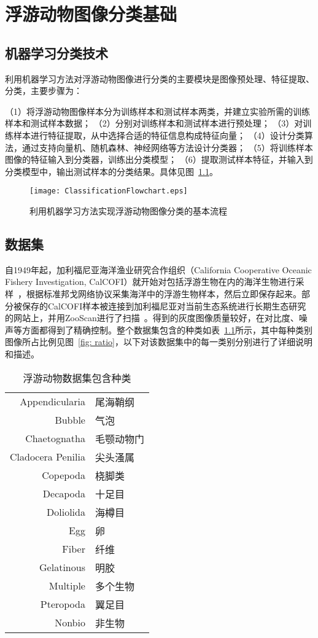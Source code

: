 \chapter{浮游动物图像分类基础}

\section{机器学习分类技术}

利用机器学习方法对浮游动物图像进行分类的主要模块是图像预处理、特征提取、分类，主要步骤为：

（1）将浮游动物图像样本分为训练样本和测试样本两类，并建立实验所需的训练样本和测试样本数据；
（2）分别对训练样本和测试样本进行预处理；
（3）对训练样本进行特征提取，从中选择合适的特征信息构成特征向量；
（4）设计分类算法，通过支持向量机、随机森林、神经网络等方法设计分类器；
（5）将训练样本图像的特征输入到分类器，训练出分类模型；
（6）提取测试样本特征，并输入到分类模型中，输出测试样本的分类结果。具体见图~\ref{fig: ClassificationFlowchart}。

\begin{figure}[h] %
\centering
\texttt{[image: ClassificationFlowchart.eps]}
\caption{利用机器学习方法实现浮游动物图像分类的基本流程}
\label{fig: ClassificationFlowchart}
\end{figure}

\section{数据集}
\label{2.1}

自1949年起，加利福尼亚海洋渔业研究合作组织（California Cooperative Oceanic Fishery Investigation, CalCOFI）就开始对包括浮游生物在内的海洋生物进行采样~\cite{bograd2003calcofi}，根据标准邦戈网络协议采集海洋中的浮游生物样本，然后立即保存起来。部分被保存的CalCOFI样本被连接到加利福尼亚对当前生态系统进行长期生态研究的网站上，并用ZooScan进行了扫描~\cite{gorsky2010digital}。得到的灰度图像质量较好，在对比度、噪声等方面都得到了精确控制。整个数据集包含的种类如表~\ref{表1}所示，其中每种类别图像所占比例见图~\ref{fig: ratio}，以下对该数据集中的每一类别分别进行了详细说明和描述。

\begin{table}[htbp]
\centering
\caption{浮游动物数据集包含种类}
\begin{tabular}{|r|l|}
\hline
Appendicularia & 尾海鞘纲 \\
Bubble & 气泡 \\ 
Chaetognatha & 毛颚动物门 \\
Cladocera Penilia & 尖头溞属 \\
Copepoda & 桡脚类 \\
Decapoda & 十足目 \\
Doliolida & 海樽目 \\
Egg & 卵 \\
Fiber & 纤维 \\
Gelatinous & 明胶 \\
Multiple & 多个生物 \\
Pteropoda & 翼足目 \\
Nonbio & 非生物 \\
\hline
\end{tabular}
\label{表1}
\end{table}

